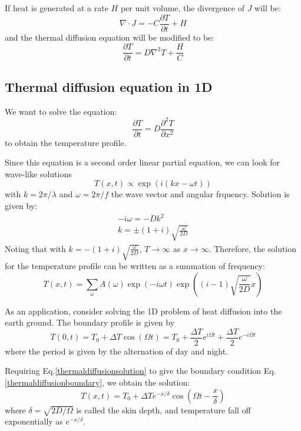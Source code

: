 \documentclass{article}
\begin{document}
If heat is generated at a rate $H$ per unit volume, the divergence of $J$ will 
be:
\begin{equation}
    \nabla \cdot J = -C \frac{\partial T}{\partial t} + H
\end{equation}
and the thermal diffusion equation will be modified to be:
\begin{equation}
    \frac{\partial T}{\partial t} = D \nabla^2 T + \frac{H}{C}
\end{equation}

\subsection*{Thermal diffusion equation in 1D}
We want to solve the equation:
\begin{equation}
    \frac{\partial T}{\partial t} = D \frac{\partial^2T}{\partial x^2}
\end{equation}
to obtain the temperature profile.

Since this equation is a second order linear partial equation, we can look for 
wave-like solutions
\begin{equation}
    T(x,t) \propto \exp(i(kx - \omega t))
\end{equation}
with $k = 2\pi/\lambda $ and $\omega = 2\pi/f$ the wave vector and angular frquency. Solution is 
given by:
\begin{gather}
    - i \omega = -D k^2 \\
    k = \pm (1 + i) \sqrt{\frac{\omega}{2D}}
\end{gather}
Noting that with $ k = -(1 + i) \sqrt{\frac{\omega}{2D}}$, $T \to \infty$ as $x \to \infty$. 
Therefore, the solution for the temperature profile can be written as a summation of frequency:
\begin{equation}
    T(x,t) = \sum_{\omega} A(\omega)\exp(-i\omega t) \exp((i-1)\sqrt{\frac{\omega}{2D}}x) \label{thermaldiffusionsolution}
\end{equation}

As an application, consider solving the 1D problem of heat diffusion into the earth ground. The 
boundary profile is given by
\begin{equation}
    T(0,t) = T_0 + \Delta T \cos(\Omega t) = T_0 + \frac{\Delta T}{2} e^{i\Omega t} + \frac{\Delta T}{2} e^{-i\Omega t} \label{thermaldiffusionboundary}
\end{equation}
where the period is given by the alternation of day and night. 

Requiring Eq.\ref{thermaldiffusionsolution} to give the boundary condition Eq.\ref{thermaldiffusionboundary}, we obtain
the solution:
\begin{equation}
    T(x,t) = T_0 + \Delta T e^{-x/\delta} \cos(\Omega t - \frac{x}{\delta})
\end{equation}
where $\delta = \sqrt{2D/\Omega}$ is called the skin depth, and temperature fall off exponentially as $e^{-x/\delta}$.
\end{document}
